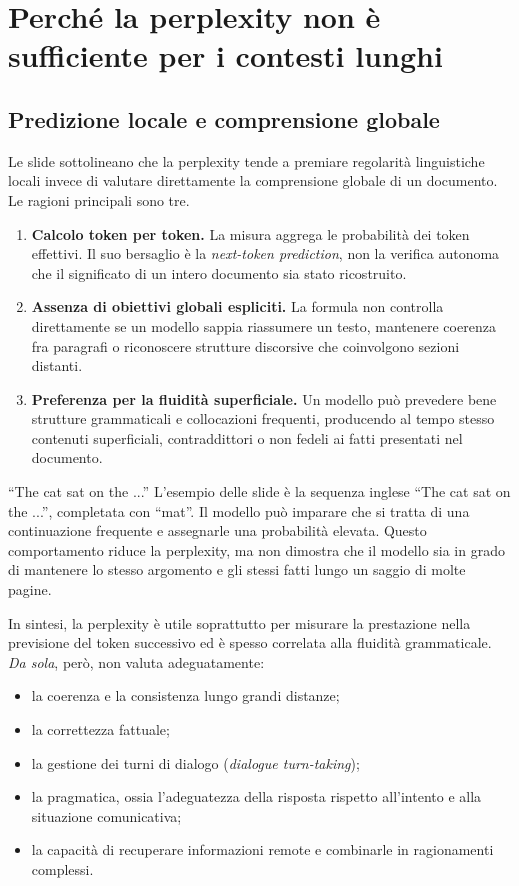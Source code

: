 \section{Perché la perplexity non è sufficiente per i contesti lunghi}

\subsection{Predizione locale e comprensione globale}

Le slide sottolineano che la perplexity tende a premiare regolarità linguistiche locali invece di valutare direttamente la comprensione globale di un documento. Le ragioni principali sono tre.

\begin{enumerate}
\item \textbf{Calcolo token per token.} La misura aggrega le probabilità dei token effettivi. Il suo bersaglio è la \emph{next-token prediction}, non la verifica autonoma che il significato di un intero documento sia stato ricostruito.
\item \textbf{Assenza di obiettivi globali espliciti.} La formula non controlla direttamente se un modello sappia riassumere un testo, mantenere coerenza fra paragrafi o riconoscere strutture discorsive che coinvolgono sezioni distanti.
\item \textbf{Preferenza per la fluidità superficiale.} Un modello può prevedere bene strutture grammaticali e collocazioni frequenti, producendo al tempo stesso contenuti superficiali, contraddittori o non fedeli ai fatti presentati nel documento.
\end{enumerate}

\begin{example}{``The cat sat on the ...''}
L'esempio delle slide è la sequenza inglese ``The cat sat on the ...'', completata con ``mat''. Il modello può imparare che si tratta di una continuazione frequente e assegnarle una probabilità elevata. Questo comportamento riduce la perplexity, ma non dimostra che il modello sia in grado di mantenere lo stesso argomento e gli stessi fatti lungo un saggio di molte pagine.
\end{example}

In sintesi, la perplexity è utile soprattutto per misurare la prestazione nella previsione del token successivo ed è spesso correlata alla fluidità grammaticale. \emph{Da sola}, però, non valuta adeguatamente:
\begin{itemize}
\item la coerenza e la consistenza lungo grandi distanze;
\item la correttezza fattuale;
\item la gestione dei turni di dialogo (\emph{dialogue turn-taking});
\item la pragmatica, ossia l'adeguatezza della risposta rispetto all'intento e alla situazione comunicativa;
\item la capacità di recuperare informazioni remote e combinarle in ragionamenti complessi.
\end{itemize}

